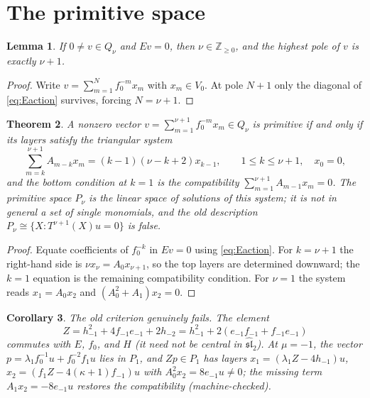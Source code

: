 \documentclass[11pt]{article}
\newcommand{\Z}{\mathbb Z}
\newcommand{\g}{\widehat{\mathfrak{sl}}_2}
\newtheorem{theorem}{Theorem}
\newtheorem{lemma}[theorem]{Lemma}
\newtheorem{corollary}[theorem]{Corollary}
\begin{document}
\section{The primitive space}

\begin{lemma}\label{lem:pole}
If $0\ne v\in Q_\nu$ and $Ev=0$, then $\nu\in\Z_{\ge0}$, and the highest
pole of $v$ is exactly $\nu+1$.
\end{lemma}

\begin{proof}
Write $v=\sum_{m=1}^{N}f_0^{-m}x_m$ with $x_m\in V_0$. At pole $N+1$ only
the diagonal of \eqref{eq:Eaction} survives, forcing $N=\nu+1$.
\end{proof}

\begin{theorem}\label{thm:P}
A nonzero vector $v=\sum_{m=1}^{\nu+1}f_0^{-m}x_m\in Q_\nu$ is primitive if
and only if its layers satisfy the triangular system
\begin{equation}\label{eq:recursion}
 \sum_{m=k}^{\nu+1}A_{m-k}x_m=(k-1)(\nu-k+2)x_{k-1},
 \qquad 1\le k\le\nu+1,\quad x_0=0,
\end{equation}
and the bottom condition at $k=1$ is the compatibility
$\sum_{m=1}^{\nu+1}A_{m-1}x_m=0$. The primitive space $P_\nu$ is the linear
space of solutions of this system; it is not in general a set of single
monomials, and the old description $P_\nu\cong\{X:T^{\nu+1}(X)u=0\}$ is
false.
\end{theorem}

\begin{proof}
Equate coefficients of $f_0^{-k}$ in $Ev=0$ using \eqref{eq:Eaction}. For
$k=\nu+1$ the right-hand side is $\nu x_\nu=A_0x_{\nu+1}$, so the top
layers are determined downward; the $k=1$ equation is the remaining
compatibility condition. For $\nu=1$ the system reads
$x_1=A_0x_2$ and $(A_0^2+A_1)x_2=0$.
\end{proof}

\begin{corollary}\label{cor:Zcounter}
The old criterion genuinely fails. The element
\[
 Z=h_{-1}^2+4f_{-1}e_{-1}+2h_{-2}
 =h_{-1}^2+2(e_{-1}f_{-1}+f_{-1}e_{-1})
\]
commutes with $E$, $f_0$, and $H$ (it need not be central in $\g$). At
$\mu=-1$, the vector $p=\lambda_1f_0^{-1}u+f_0^{-2}f_1u$ lies in $P_1$, and
$Zp\in P_1$ has layers
$x_1=(\lambda_1Z-4h_{-1})u$, $x_2=(f_1Z-4(\kappa+1)f_{-1})u$ with
$A_0^2x_2=8e_{-1}u\ne0$; the missing term $A_1x_2=-8e_{-1}u$ restores the
compatibility (machine-checked).
\end{corollary}
\end{document}
